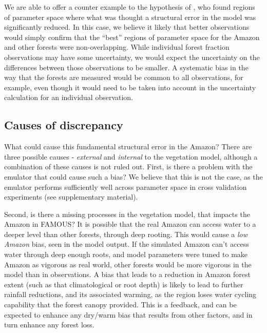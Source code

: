 \documentclass[esd, article]{copernicus} %
\begin{document}
We are able to offer a counter example to the hypothesis of \cite{williamson2014identifying}, who found regions of parameter space where what was thought a structural error in the model was significantly reduced. In this case, we believe it likely that better observations would simply confirm that the ``best'' regions of parameter space for the Amazon and other forests were non-overlapping. While individual forest fraction observations may have some uncertainty, we would expect the uncertainty on the differences between those observations to be smaller. A systematic bias in the way that the forests are measured would be common to all observations, for example, even though it would need to be taken into account in the uncertainty calculation for an individual observation.

\subsection{Causes of discrepancy}\label{ssec:causes}
What could cause this fundamental structural error in the Amazon? There are three possible causes - \emph{external} and \emph{internal} to the vegetation model, although a combination of these causes is not ruled out. First, is there a problem with the emulator that could cause such a bias? We believe that this is not the case, as the emulator performs sufficiently well across parameter space in cross validation experiments (see supplementary material).

Second, is there a missing processes in the vegetation model, that impacts the Amazon in FAMOUS? It is possible that the real Amazon can access water to a deeper level than other forests, through deep rooting. This would cause a \emph{low Amazon} bias, seen in the model output. If the simulated Amazon can't access water through deep enough roots, and model parameters were tuned to make Amazon as vigorous as real world, other forests would be more vigorous in the model than in observations. A bias that leads to a reduction in Amazon forest extent (such as that climatological or root depth) is likely to lead to further rainfall reductions, and its associated warming, as the region loses water cycling capability that the forest canopy provided.  This is a feedback, and can be expected to enhance any dry/warm bias that results from other factors, and in turn enhance any forest loss.
\end{document}
